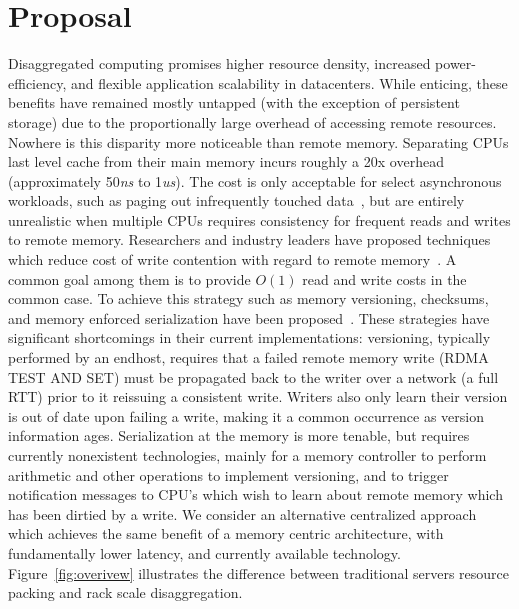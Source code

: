 \section{Proposal}
\label{sec:intro}

Disaggregated computing promises higher resource density, increased
power-efficiency, and flexible application scalability in datacenters.
While enticing, these benefits have remained mostly untapped (with the
exception of persistent storage) due to the proportionally large
overhead of accessing remote resources. Nowhere is this disparity more
noticeable than remote memory. Separating CPUs last level cache from
their main memory incurs roughly a 20x overhead (approximately
50\textit{ns} to 1\textit{us}). The cost is only acceptable for select
asynchronous workloads, such as paging out infrequently touched
data~\cite{gms}, but are entirely unrealistic when multiple CPUs
requires consistency for frequent reads and writes to remote memory.
Researchers and industry leaders have proposed techniques which reduce
cost of write contention with regard to remote
memory~\cite{clover,aguilera2019designing,cell,storm,sonuma}. A common
goal among them is to provide $O(1)$ read and write costs in the
common case. To achieve this strategy such as memory versioning,
checksums, and memory enforced serialization have been
proposed~\cite{aguilera2019designing}. These strategies have
significant shortcomings in their current implementations: versioning,
typically performed by an endhost, requires that a failed remote
memory write (RDMA TEST AND SET)  must be propagated back to the
writer over a network (a full RTT) prior to it reissuing a consistent
write. Writers also only learn their version is out of date upon
failing a write, making it a common occurrence as version information
ages.  Serialization at the memory is more tenable, but requires
currently nonexistent technologies, mainly for a memory controller to
perform arithmetic and other operations to implement versioning, and
to trigger notification messages to CPU's which wish to learn about
remote memory which has been dirtied by a write. We consider an
alternative centralized approach which achieves the same benefit of a
memory centric architecture, with fundamentally lower latency, and
currently available technology. Figure~\ref{fig:overivew} illustrates
the difference between traditional servers resource packing and rack
scale disaggregation.


